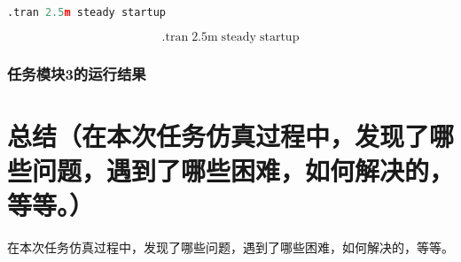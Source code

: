 \documentclass[lang=cn,10pt]{elegantbook}
\begin{document}
\begin{lstlisting}[language=Python, caption=输出瞬态响应]
.tran 2.5m steady startup
\end{lstlisting}

\begin{equation*}
\mathrm{.tran\;2.5m\;steady\;startup}
\end{equation*}

\subsection{任务模块3的运行结果}

\chapter{总结（在本次任务仿真过程中，发现了哪些问题，遇到了哪些困难，如何解决的，等等。）}

在本次任务仿真过程中，发现了哪些问题，遇到了哪些困难，如何解决的，等等。

\printbibliography[heading=bibintoc, title=\ebibname]





\end{document}
